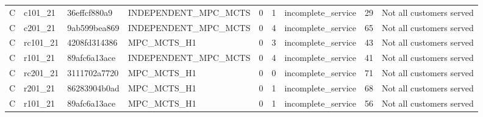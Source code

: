 \begin{table}
{\begin{tabular}{llllrrlrl}
C & c101\_21 & 36effcf880a9 & INDEPENDENT\_MPC\_MCTS & 0 & 1 & incomplete\_service & 29 & Not all customers served \\
C & c201\_21 & 9ab599bea869 & INDEPENDENT\_MPC\_MCTS & 0 & 4 & incomplete\_service & 65 & Not all customers served \\
C & rc101\_21 & 4208fd314386 & MPC\_MCTS\_H1 & 0 & 3 & incomplete\_service & 43 & Not all customers served \\
C & r101\_21 & 89afc6a13ace & INDEPENDENT\_MPC\_MCTS & 0 & 4 & incomplete\_service & 41 & Not all customers served \\
C & rc201\_21 & 3111702a7720 & MPC\_MCTS\_H1 & 0 & 0 & incomplete\_service & 71 & Not all customers served \\
C & r201\_21 & 86283904b0ad & MPC\_MCTS\_H1 & 0 & 1 & incomplete\_service & 68 & Not all customers served \\
C & r101\_21 & 89afc6a13ace & MPC\_MCTS\_H1 & 0 & 1 & incomplete\_service & 56 & Not all customers served \\
\bottomrule
\end{tabular}
}
\end{table}

